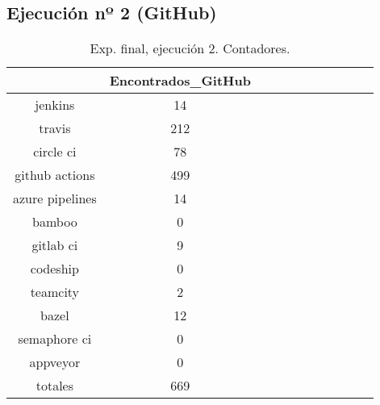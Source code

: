 \subsection{Ejecución nº 2 (GitHub)}
\begin{table}[h]
  \centering
  \caption{Exp. final, ejecución 2. Contadores.}
  \label{tab:tabla_f2_1}

\begin{footnotesize}
\renewcommand{\arraystretch}{1.5} %
\begin{tabular}{ccccccccccc}
  \hline
  {} &  Encontrados\_GitHub \\
  \hline
  jenkins         &                  14 \\
  travis          &                 212 \\
  circle ci       &                  78 \\
  github actions  &                 499 \\
  azure pipelines &                  14 \\
  bamboo          &                   0 \\
  gitlab ci       &                   9 \\
  codeship        &                   0 \\
  teamcity        &                   2 \\
  bazel           &                  12 \\
  semaphore ci    &                   0 \\
  appveyor        &                   0 \\
  totales         &                 669 \\
 \end{tabular}
\end{footnotesize}

\end{table}

